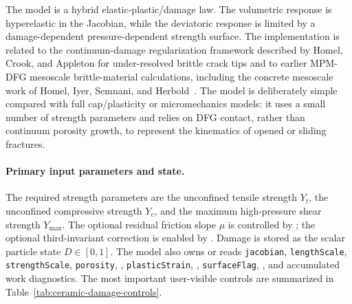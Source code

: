 The model is a hybrid elastic-plastic/damage law.  The volumetric response is hyperelastic in the Jacobian, while the deviatoric response is limited by a damage-dependent pressure-dependent strength surface.  The implementation is related to the continuum-damage regularization framework described by Homel, Crook, and Appleton for under-resolved brittle crack tips and to earlier MPM-DFG mesoscale brittle-material calculations, including the concrete mesoscale work of Homel, Iyer, Semnani, and Herbold~\cite{homelCrookAppleton2026sizeeffects,homel2022uhpc,homel2016dfg}.  The model is deliberately simple compared with full cap/plasticity or micromechanics models: it uses a small number of strength parameters and relies on DFG contact, rather than continuum porosity growth, to represent the kinematics of opened or sliding fractures.

\paragraph{Primary input parameters and state.}
The required strength parameters are the unconfined tensile strength \(Y_t\), the unconfined compressive strength \(Y_c\), and the maximum high-pressure shear strength \(Y_{\max}\).  The optional residual friction slope \(\mu\) is controlled by ; the optional third-invariant correction is enabled by .  Damage is stored as the scalar particle state \(D\in[0,1]\).  The model also owns or reads \texttt{jacobian}, \texttt{lengthScale}, \texttt{strengthScale}, \texttt{porosity}, , \texttt{plasticStrain}, , \texttt{surfaceFlag}, , and accumulated work diagnostics.  The most important user-visible controls are summarized in Table~\ref{tab:ceramic-damage-controls}.

